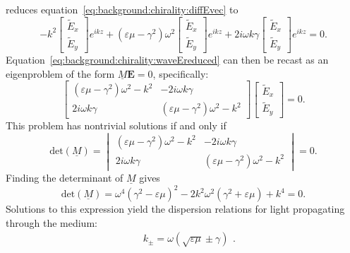 reduces equation~\ref{eq:background:chirality:diffEvec} to
\begin{equation}\label{eq:background:chirality:waveEreduced}
    -k^2 \begin{bmatrix}\tilde E_x\\ \tilde E_y\end{bmatrix} e^{i k z} + (\varepsilon \mu - \gamma^2)\omega^2 \begin{bmatrix}\tilde E_x\\ \tilde E_y\end{bmatrix} e^{i k z} + 2 i \omega k \gamma \begin{bmatrix}\tilde E_x\\ \tilde E_y\end{bmatrix} e^{i k z} = 0.
\end{equation}
Equation~\ref{eq:background:chirality:waveEreduced} can then be recast as an eigenproblem of the form $\underline{M}\mathbf{E} = 0$, specifically:
\begin{equation}
    \begin{bmatrix}
		(\varepsilon \mu - \gamma^2)\omega^2 -k^2  & -2 i \omega k \gamma \\ 
		2 i \omega k \gamma & (\varepsilon \mu - \gamma^2)\omega^2 -k^2
    \end{bmatrix}
    \begin{bmatrix} 
        \tilde E_x \\ 
        \tilde E_y
    \end{bmatrix} 
    = 0.
\end{equation}
This problem has nontrivial solutions if and only if 
\begin{equation}
    \mathrm{det}(\underline{M}) = 
    \begin{vmatrix}
        (\varepsilon \mu - \gamma^2)\omega^2 -k^2  & -2 i \omega k \gamma \\ 
		2 i \omega k \gamma & (\varepsilon \mu - \gamma^2)\omega^2 -k^2
    \end{vmatrix}    
    = 0.
\end{equation}
Finding the determinant of $\underline{M}$ gives
\begin{equation}
    \mathrm{det}(\underline{M}) = 
    \omega^4 (\gamma^2 - \varepsilon \mu)^2 - 2 k^2 \omega^2 (\gamma^2 + \varepsilon \mu) + k^4
    = 0.
\end{equation}
Solutions to this expression yield the dispersion relations for light propagating through the medium:
\begin{equation}
    \begin{split}
        & k_{\pm} = \omega (\sqrt{\varepsilon \mu} \pm \gamma)
    \end{split}.
\end{equation}
